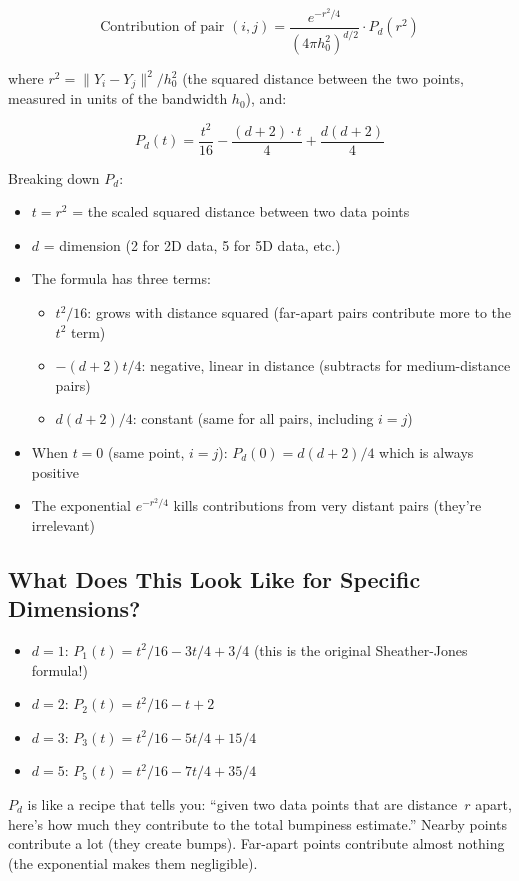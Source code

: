 \documentclass[12pt]{article}
\newcommand{\analogy}[1]{\begin{tcolorbox}[colback=green!5,colframe=green!50!black,title=Analogy]\small #1\end{tcolorbox}}
\newcommand{\step}[1]{\begin{tcolorbox}[colback=blue!5,colframe=blue!50!black,title=Step-by-Step]\small #1\end{tcolorbox}}
\begin{document}
$$\text{Contribution of pair } (i,j) = \frac{e^{-r^2/4}}{(4\pi h_0^2)^{d/2}} \cdot P_d(r^2)$$

where $r^2 = \|Y_i - Y_j\|^2 / h_0^2$ (the squared distance between the two points, measured in units of the bandwidth $h_0$), and:

$$\boxed{P_d(t) = \frac{t^2}{16} - \frac{(d+2) \cdot t}{4} + \frac{d(d+2)}{4}}$$

\step{
Breaking down $P_d$:
\begin{itemize}
\item $t = r^2$ = the scaled squared distance between two data points
\item $d$ = dimension (2 for 2D data, 5 for 5D data, etc.)
\item The formula has three terms:
\begin{itemize}
    \item $t^2/16$: grows with distance squared (far-apart pairs contribute more to the $t^2$ term)
    \item $-(d+2)t/4$: negative, linear in distance (subtracts for medium-distance pairs)
    \item $d(d+2)/4$: constant (same for all pairs, including $i=j$)
\end{itemize}
\item When $t=0$ (same point, $i=j$): $P_d(0) = d(d+2)/4$ which is always positive
\item The exponential $e^{-r^2/4}$ kills contributions from very distant pairs (they're irrelevant)
\end{itemize}
}

\subsection{What Does This Look Like for Specific Dimensions?}

\begin{itemize}
\item $d=1$: $P_1(t) = t^2/16 - 3t/4 + 3/4$ (this is the original Sheather-Jones formula!)
\item $d=2$: $P_2(t) = t^2/16 - t + 2$
\item $d=3$: $P_3(t) = t^2/16 - 5t/4 + 15/4$
\item $d=5$: $P_5(t) = t^2/16 - 7t/4 + 35/4$
\end{itemize}

\analogy{$P_d$ is like a recipe that tells you: ``given two data points that are distance~$r$ apart, here's how much they contribute to the total bumpiness estimate.'' Nearby points contribute a lot (they create bumps). Far-apart points contribute almost nothing (the exponential makes them negligible).}
\end{document}
